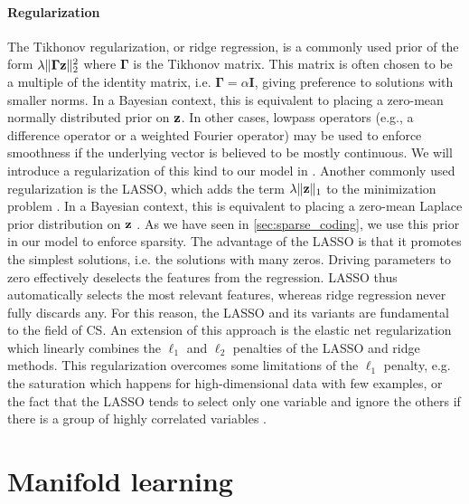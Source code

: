 \paragraph{Regularization}
The Tikhonov regularization, or ridge regression, is a commonly used prior of the form $\lambda \| \mathbf{\Gamma} \mathbf{z} \|_2^2$ where $\mathbf{\Gamma}$ is the Tikhonov matrix. This matrix is often chosen to be a multiple of the identity matrix, i.e. $\mathbf{\Gamma} = \alpha \mathbf{I}$, giving preference to solutions with smaller norms. In a Bayesian context, this is equivalent to placing a zero-mean normally distributed prior on $\mathbf{z}$. In other cases, lowpass operators (e.g., a difference operator or a weighted Fourier operator) may be used to enforce smoothness if the underlying vector is believed to be mostly continuous. We will introduce a regularization of this kind to our model in .
Another commonly used regularization is the \gls{LASSO}, which adds the term $\lambda \| \mathbf{z} \|_1$ to the minimization problem \cite{tibshirani1996Lasso}. In a Bayesian context, this is equivalent to placing a zero-mean Laplace prior distribution on $\mathbf{z}$ \cite{park2008BayesianLasso}. As we have seen in \ref{sec:sparse_coding}, we use this prior in our model to enforce sparsity. The advantage of the \gls{LASSO} is that it promotes the simplest solutions, i.e. the solutions with many zeros. Driving parameters to zero effectively deselects the features from the regression. \gls{LASSO} thus automatically selects the most relevant features, whereas ridge regression never fully discards any. For this reason, the \gls{LASSO} and its variants are fundamental to the field of \gls{CS}.
An extension of this approach is the elastic net regularization which linearly combines the $\ell_1$ and $\ell_2$ penalties of the \gls{LASSO} and ridge methods. This regularization overcomes some limitations of the $\ell_1$ penalty, e.g. the saturation which happens for high-dimensional data with few examples, or the fact that the \gls{LASSO} tends to select only one variable and ignore the others if there is a group of highly correlated variables \cite{zou2005ElasticNet}.

\section{Manifold learning} \label{sec:manifold_learning}


